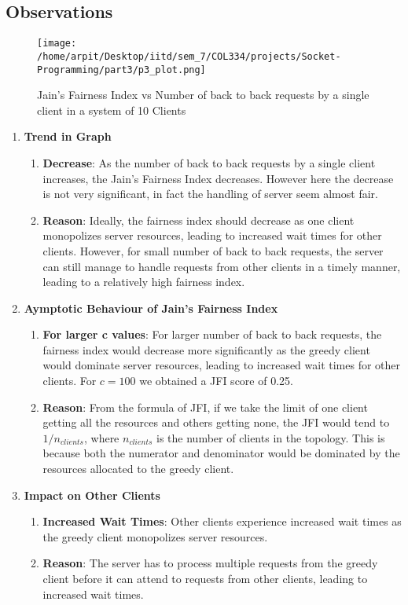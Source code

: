 \documentclass[12pt]{article}
\begin{document}
\subsection{Observations}

\begin{figure}[h!]
    \centering
    \texttt{[image: /home/arpit/Desktop/iitd/sem\_7/COL334/projects/Socket-Programming/part3/p3\_plot.png]}
    \caption{Jain's Fairness Index vs Number of back to back requests by a single client in a system of 10 Clients}
    \label{fig:part3_output}
\end{figure}

\begin{enumerate}
    \item \textbf{Trend in Graph}
    \begin{enumerate}
        \item \textbf{Decrease}: As the number of back to back requests by a single client increases, the Jain's Fairness Index decreases. However here the decrease is not very significant, in fact the handling of server seem almost fair.
        \item \textbf{Reason}: Ideally, the fairness index should decrease as one client monopolizes server resources, leading to increased wait times for other clients. However, for small number of back to back requests, the server can still manage to handle requests from other clients in a timely manner, leading to a relatively high fairness index.
    \end{enumerate}
    \item \textbf{Aymptotic Behaviour of Jain's Fairness Index}
    \begin{enumerate}
        \item \textbf{For larger c values}: For larger number of back to back requests, the fairness index would decrease more significantly as the greedy client would dominate server resources, leading to increased wait times for other clients. For $c = 100$ we obtained a JFI score of 0.25.
        \item \textbf{Reason}: From the formula of JFI, if we take the limit of one client getting all the resources and others getting none, the JFI would tend to $1/n_{clients}$, where $n_{clients}$ is the number of clients in the topology. This is because both the numerator and denominator would be dominated by the resources allocated to the greedy client.
    \end{enumerate}     
    \item \textbf{Impact on Other Clients}
    \begin{enumerate}
        \item \textbf{Increased Wait Times}: Other clients experience increased wait times as the greedy client monopolizes server resources.
        \item \textbf{Reason}: The server has to process multiple requests from the greedy client before it can attend to requests from other clients, leading to increased wait times.
    \end{enumerate}
\end{enumerate}
\end{document}
